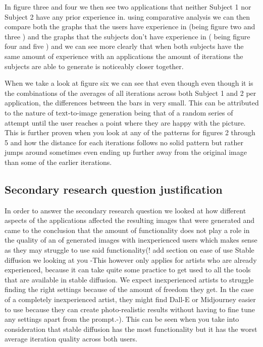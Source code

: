 \documentclass[]{report}
\begin{document}
	
	In figure three and four we then see two applications that neither Subject 1 nor Subject 2 have any prior experience in. using comparative analysis we can then compare both the graphs that the users have experience in (being figure two and three ) and the graphs that the subjects don't have experience in ( being figure four and five ) and we can see more clearly that when both subjects have the same amount of experience with an applications the amount of iterations the subjects are able to generate is noticeably closer together. 
	

	
	When we take a look at figure six we can see that even though even though it is the combinations of the averages of all iterations across both Subject 1 and 2 per application, the differences between the bars in very small. This can be attributed to the nature of text-to-image generation being that of a random series of attempt until the user reaches a point where they are happy with the picture. This is further proven when you look at any of the patterns for figures 2 through 5 and how the distance for each iterations follows no solid pattern but rather jumps around sometimes even ending up further away from the original image than some of the earlier iterations.
	
	
	\subsection{Secondary research question justification}
	
	In order to answer the secondary research question we looked at how different aspects of the applications affected the resulting images that were generated and came to the conclusion that the amount of functionality does not play a role in the quality of an of generated images with inexperienced users which makes sense as they may struggle to use said functionality(! add section on ease of use Stable diffusion we looking at you -This however only applies for artists who are already experienced, because it can take quite some practice to get used to all the tools that are available in stable diffusion. We expect inexperienced artists to struggle finding the right settings because of the amount of freedom they get. In the case of a completely inexperienced artist, they might find Dall-E or Midjourney easier to use because they can create photo-realistic results without having to fine tune any settings apart from the prompt.-). This can be seen when you take into consideration that stable diffusion has the most functionality but it has the worst average iteration quality across both users. 
	
\end{document}
